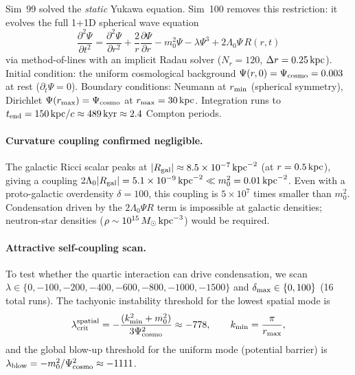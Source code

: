 \documentclass[12pt,a4paper]{article}
\begin{document}
Sim~99 solved the \emph{static} Yukawa equation.  Sim~100 removes this
restriction: it evolves the full 1+1D spherical wave equation
\begin{equation}
\frac{\partial^2\Psi}{\partial t^2}
  = \frac{\partial^2\Psi}{\partial r^2}
  + \frac{2}{r}\frac{\partial\Psi}{\partial r}
  - m_0^2\Psi - \lambda\Psi^3
  + 2\Lambda_0\Psi\, R(r,t)
\label{eq:psi_timedomain}
\end{equation}
via method-of-lines with an implicit Radau solver ($N_r=120$, $\Delta
r=0.25\,{\rm kpc}$).  Initial condition: the uniform cosmological
background $\Psi(r,0)=\Psi_{\rm cosmo}=0.003$ at rest
($\partial_t\Psi=0$). Boundary conditions: Neumann at $r_{\rm min}$
(spherical symmetry), Dirichlet $\Psi(r_{\rm max})=\Psi_{\rm cosmo}$ at
$r_{\rm max}=30\,{\rm kpc}$.  Integration runs to $t_{\rm end}=150\,{\rm
kpc}/c \approx 489\,{\rm kyr} \approx 2.4$ Compton periods.

\paragraph{Curvature coupling confirmed negligible.}
The galactic Ricci scalar peaks at
$|R_{\rm gal}| \approx 8.5\times10^{-7}\,{\rm kpc}^{-2}$ (at
$r=0.5\,{\rm kpc}$), giving a coupling
$2\Lambda_0|R_{\rm gal}| = 5.1\times10^{-9}\,{\rm kpc}^{-2}
\ll m_0^2 = 0.01\,{\rm kpc}^{-2}$.
Even with a proto-galactic overdensity $\delta=100$, this coupling is
$5\times10^7$ times smaller than $m_0^2$.  Condensation driven by the
$2\Lambda_0\Psi R$ term is impossible at galactic densities; neutron-star
densities ($\rho\sim10^{15}\,M_\odot\,{\rm kpc}^{-3}$) would be required.

\paragraph{Attractive self-coupling scan.}
To test whether the quartic interaction can drive condensation, we scan
$\lambda\in\{0,-100,-200,-400,-600,-800,-1000,-1500\}$ and
$\delta_{\rm max}\in\{0,100\}$ (16 total runs).  The tachyonic instability
threshold for the lowest spatial mode is
\begin{equation}
  \lambda_{\rm crit}^{\rm spatial}
    = -\frac{(k_{\rm min}^2 + m_0^2)}{3\Psi_{\rm cosmo}^2}
    \approx -778,
  \qquad
  k_{\rm min} = \frac{\pi}{r_{\rm max}},
\end{equation}
and the global blow-up threshold for the uniform mode (potential barrier)
is $\lambda_{\rm blow} = -m_0^2/\Psi_{\rm cosmo}^2 \approx -1111$.
\end{document}
